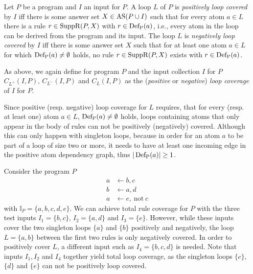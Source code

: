 \begin{definition}
\label{def:loop coverage}
    Let $P$ be a program and $I$ an input for $P$. A loop $L$ of $P$ is \emph{positively loop covered} by $I$ iff there is some answer set \(X \in \operatorname{AS}(P \cup I)\) such that for every atom \(a \in L\) there is a rule \(r \in \operatorname{SuppR}(P, X)\) with \(r \in \operatorname{Def_P}(a)\), i.e., every atom in the loop can be derived from the program and its input.
    The loop $L$ is \emph{negatively loop covered} by $I$ iff there is some answer set $X$ such that for at least one atom \(a \in L\) for which \(\operatorname{Def_P}(a) \neq \emptyset\) holds, no rule \(r \in \operatorname{SuppR}(P, X)\) exists with \(r \in \operatorname{Def_P}(a)\).
\end{definition}

As above, we again define for program $P$ and the input collection $I$ for $P$ \(C_{L^+}(I, P)\), \(C_{L^-}(I, P)\) and \(C_{L}(I, P)\) as the (\emph{positive} or \emph{negative}) \emph{loop coverage} of $I$ for $P$.

Since positive (resp. negative) loop coverage for $L$ requires, that for every (resp. at least one) atom \(a \in L\), \(\operatorname{Def_P}(a) \neq \emptyset\) holds, loops containing atoms that only appear in the body of rules can not be positively (negatively) covered. Although this can only happen with singleton loops, because in order for an atom $a$ to be part of a loop of size two or more, it needs to have at least one incoming edge in the positive atom dependency graph, thus \(| \operatorname{Def_P}(a) | \geq 1\).

\begin{example}
\label{ex:loop coverage}
    Consider the program $P$
    \begin{align*}
        a &\leftarrow b, c \\
        b &\leftarrow a, d \\
        a &\leftarrow e,\ \text{not}\ c
    \end{align*}
    with \(\mathbb{I}_P = \{a, b, c, d, e\}\). We can achieve total rule coverage for $P$ with the three test inputs \(I_1 = \{b, c\}\), \(I_2 = \{a, d\}\) and \(I_3 = \{e\}\). However, while these inputs cover the two singleton loops \(\{a\}\) and \(\{b\}\) positively and negatively, the loop \(L = \{a, b\}\) between the first two rules is only negatively covered. In order to positively cover $L$, a different input such as \(I_4 = \{b, c, d\}\) is needed.
    Note that inputs \(I_1, I_2\) and \(I_4\) together yield total loop coverage, as the singleton loops \(\{c\}\), \(\{d\}\) and \(\{e\}\) can not be positively loop covered.
\end{example}

